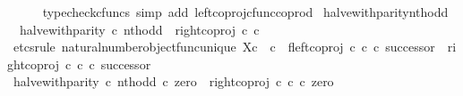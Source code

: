 \begin{isabellebody}
\ \ \ \ \isamarkupfalse%
\ {\isacharparenleft}{\kern0pt}typecheck{\isacharunderscore}{\kern0pt}cfuncs{\isacharcomma}{\kern0pt}\ simp\ add{\isacharcolon}{\kern0pt}\ left{\isacharunderscore}{\kern0pt}coproj{\isacharunderscore}{\kern0pt}cfunc{\isacharunderscore}{\kern0pt}coprod{\isacharparenright}{\kern0pt}\isanewline
{}\isamarkupfalse%
%
\endisatagproof
{\isafoldproof}%
%
\isadelimproof
\isanewline
%
\endisadelimproof
\isanewline
{}\isamarkupfalse%
\ halve{\isacharunderscore}{\kern0pt}with{\isacharunderscore}{\kern0pt}parity{\isacharunderscore}{\kern0pt}nth{\isacharunderscore}{\kern0pt}odd{\isacharcolon}{\kern0pt}\isanewline
\ \ {\isachardoublequoteopen}halve{\isacharunderscore}{\kern0pt}with{\isacharunderscore}{\kern0pt}parity\ {\isasymcirc}\isactrlsub c\ nth{\isacharunderscore}{\kern0pt}odd\ {\isacharequal}{\kern0pt}\ right{\isacharunderscore}{\kern0pt}coproj\ {\isasymnat}\isactrlsub c\ {\isasymnat}\isactrlsub c{\isachardoublequoteclose}\isanewline
%
\isadelimproof
%
\endisadelimproof
%
\isatagproof
{}\isamarkupfalse%
\ {\isacharparenleft}{\kern0pt}etcs{\isacharunderscore}{\kern0pt}rule\ natural{\isacharunderscore}{\kern0pt}number{\isacharunderscore}{\kern0pt}object{\isacharunderscore}{\kern0pt}func{\isacharunderscore}{\kern0pt}unique{\isacharbrackleft}{\kern0pt}\ X{\isacharequal}{\kern0pt}{\isachardoublequoteopen}{\isasymnat}\isactrlsub c\ {\isasymCoprod}\ {\isasymnat}\isactrlsub c{\isachardoublequoteclose}{\isacharcomma}{\kern0pt}\ \ f{\isacharequal}{\kern0pt}{\isachardoublequoteopen}{\isacharparenleft}{\kern0pt}left{\isacharunderscore}{\kern0pt}coproj\ {\isasymnat}\isactrlsub c\ {\isasymnat}\isactrlsub c\ {\isasymcirc}\isactrlsub c\ successor{\isacharparenright}{\kern0pt}\ {\isasymamalg}\ {\isacharparenleft}{\kern0pt}right{\isacharunderscore}{\kern0pt}coproj\ {\isasymnat}\isactrlsub c\ {\isasymnat}\isactrlsub c\ {\isasymcirc}\isactrlsub c\ successor{\isacharparenright}{\kern0pt}{\isachardoublequoteclose}{\isacharbrackright}{\kern0pt}{\isacharparenright}{\kern0pt}\isanewline
\ \ \isamarkupfalse%
\ {\isachardoublequoteopen}{\isacharparenleft}{\kern0pt}halve{\isacharunderscore}{\kern0pt}with{\isacharunderscore}{\kern0pt}parity\ {\isasymcirc}\isactrlsub c\ nth{\isacharunderscore}{\kern0pt}odd{\isacharparenright}{\kern0pt}\ {\isasymcirc}\isactrlsub c\ zero\ {\isacharequal}{\kern0pt}\ right{\isacharunderscore}{\kern0pt}coproj\ {\isasymnat}\isactrlsub c\ {\isasymnat}\isactrlsub c\ {\isasymcirc}\isactrlsub c\ zero{\isachardoublequoteclose}\isanewline

\end{isabellebody}
